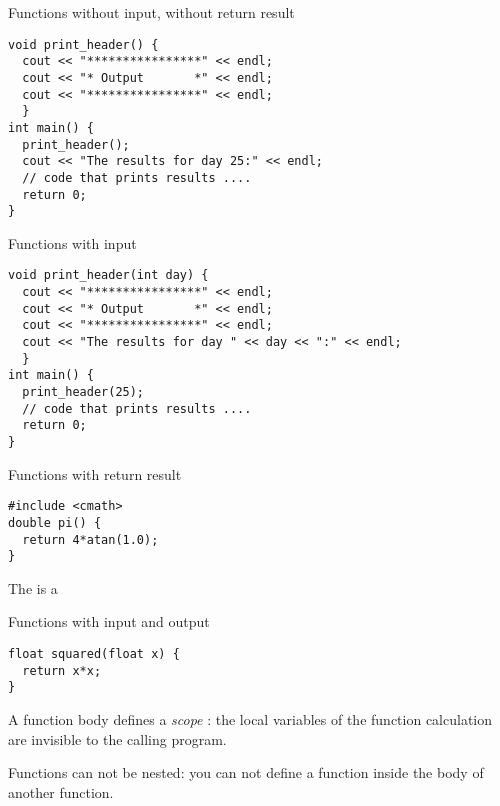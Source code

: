 \begin{block}{Functions without input, without return result}
  \label{sl:func-ex1}
\begin{verbatim}
void print_header() {
  cout << "****************" << endl;
  cout << "* Output       *" << endl;
  cout << "****************" << endl;
  }
int main() {
  print_header();
  cout << "The results for day 25:" << endl;
  // code that prints results ....
  return 0;
}
\end{verbatim}
\end{block}

\begin{block}{Functions with input}
  \label{sl:func-ex2}
\begin{verbatim}
void print_header(int day) {
  cout << "****************" << endl;
  cout << "* Output       *" << endl;
  cout << "****************" << endl;
  cout << "The results for day " << day << ":" << endl;
  }
int main() {
  print_header(25);
  // code that prints results ....
  return 0;
}
\end{verbatim}
\end{block}

\begin{block}{Functions with return result}
  \label{sl:func-return}
\begin{verbatim}
#include <cmath>
double pi() {
  return 4*atan(1.0);
}
\end{verbatim}
The  is a 
\end{block}

\begin{block}{Functions with input and output}
  \label{sl:func-param-return}
\begin{verbatim}
float squared(float x) {
  return x*x;
}
\end{verbatim}
\end{block}

A function body defines a
%
\emph{scope}%
:
the local variables of the function calculation are invisible to the
calling program.

Functions can not be nested: you can not define a function inside the
body of another function.

